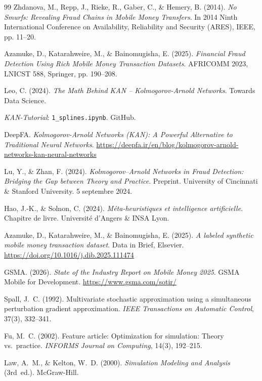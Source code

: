 \documentclass[11pt,a4paper,oneside]{report}
\theoremstyle{definition}
\theoremstyle{remark}
\begin{document}
\begin{thebibliography}{99}
Zhdanova, M., Repp, J., Rieke, R., Gaber, C., \& Hemery, B. (2014).
\textit{No Smurfs: Revealing Fraud Chains in Mobile Money Transfers}.
In 2014 Ninth International Conference on Availability, Reliability and Security (ARES), IEEE, pp. 11--20.

Azamuke, D., Katarahweire, M., \& Bainomugisha, E. (2025).
\textit{Financial Fraud Detection Using Rich Mobile Money Transaction Datasets}.
AFRICOMM 2023, LNICST 588, Springer, pp. 190--208.

Leo, C. (2024).
\textit{The Math Behind KAN -- Kolmogorov-Arnold Networks}.
Towards Data Science.

\textit{KAN-Tutorial}: \texttt{1\_splines.ipynb}.
GitHub.

DeepFA.
\textit{Kolmogorov-Arnold Networks (KAN): A Powerful Alternative to Traditional Neural Networks}.
\url{https://deepfa.ir/en/blog/kolmogorov-arnold-networks-kan-neural-networks}

Lu, Y., \& Zhan, F. (2024).
\textit{Kolmogorov--Arnold Networks in Fraud Detection: Bridging the Gap between Theory and Practice}.
Preprint. University of Cincinnati \& Stanford University. 5 septembre 2024.

Hao, J.-K., \& Solnon, C. (2024).
\textit{Méta-heuristiques et intelligence artificielle}.
Chapitre de livre. Université d'Angers \& INSA Lyon.

Azamuke, D., Katarahweire, M., \& Bainomugisha, E. (2025).
\textit{A labeled synthetic mobile money transaction dataset}.
Data in Brief, Elsevier.
\url{https://doi.org/10.1016/j.dib.2025.111474}

GSMA. (2026).
\textit{State of the Industry Report on Mobile Money 2025}.
GSMA Mobile for Development.
\url{https://www.gsma.com/sotir/}

Spall, J.~C. (1992).
Multivariate stochastic approximation using a simultaneous perturbation gradient approximation.
\textit{IEEE Transactions on Automatic Control}, 37(3), 332--341.

Fu, M.~C. (2002).
Feature article: Optimization for simulation: Theory vs.\ practice.
\textit{INFORMS Journal on Computing}, 14(3), 192--215.

Law, A.~M., \& Kelton, W.~D. (2000).
\textit{Simulation Modeling and Analysis} (3rd~ed.).
McGraw-Hill.


\end{thebibliography}
\end{document}
